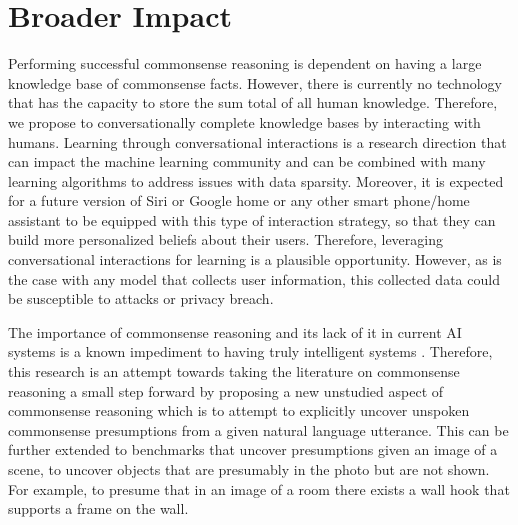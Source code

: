 \section*{Broader Impact}
Performing successful commonsense reasoning is dependent on having a large knowledge base of commonsense facts.
However, there is currently no technology that has the capacity to store the sum total of all human knowledge.
Therefore, we propose to conversationally complete knowledge bases by interacting with humans. Learning through conversational interactions is a research direction that can impact the machine learning community and can be combined with many learning algorithms to address issues with data sparsity. 
Moreover, it is expected for a future version of Siri or Google home or any other smart phone/home assistant to be equipped with this type of interaction strategy, so that they can build more personalized beliefs about their users. Therefore, leveraging conversational interactions for learning is a plausible opportunity. However, as is the case with any model that collects user information, this collected data could be susceptible to attacks or privacy breach.

The importance of commonsense reasoning and its lack of it in current AI systems is a known impediment to having truly intelligent systems \cite{davis2015commonsense}. Therefore, this research is an attempt towards taking the literature on commonsense reasoning a small step forward 
by proposing a new unstudied aspect of commonsense reasoning which is to attempt to explicitly uncover unspoken commonsense presumptions from a given natural language utterance.
This can be further extended to benchmarks that uncover presumptions given an image of a scene, to uncover objects that are presumably in the photo but are not shown. For example, to presume that in an image of a room there exists a wall hook that supports a frame on the wall.

